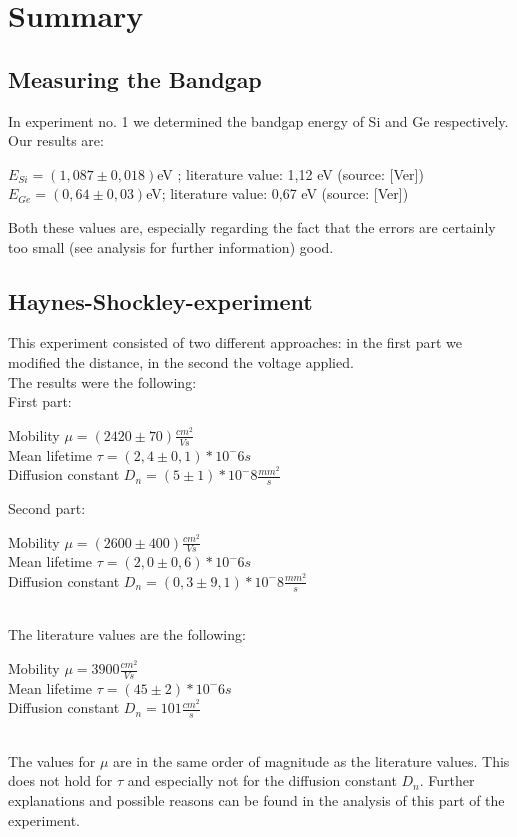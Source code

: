 \chapter{Summary}
\section{Measuring the Bandgap}
In experiment no. 1 we determined the bandgap energy of Si and Ge respectively. Our results are:\\
\begin{center}
$E_{Si}=(1,087\pm 0,018)$eV ; literature value: 1,12 eV (source: [Ver])\\
$E_{Ge}=(0,64\pm0,03)$eV; literature value: 0,67 eV (source: [Ver])\\
\end{center}
Both these values are, especially regarding the fact that the errors are certainly too small (see analysis for further information) good. \\
\section{Haynes-Shockley-experiment}
This experiment consisted of two different approaches: in the first part we modified the distance, in the second the voltage applied.\\
The results were the following:\\
First part:\\
\begin{center}
Mobility $\mu=(2420\pm 70)\frac{cm^2}{Vs}$\\
Mean lifetime $\tau=(2,4\pm 0,1)*10^-6 s$\\
Diffusion constant $D_{n}=(5\pm1)*10^-8 \frac{mm^2}{s}$
\end{center}
Second part:\\
\begin{center}
Mobility $\mu=(2600\pm 400) \frac{cm^2}{Vs}$\\
Mean lifetime $\tau=(2,0\pm 0,6)*10^-6 s$\\
Diffusion constant $D_{n}=(0,3\pm9,1)*10^-8 \frac{mm^2}{s}$
\end{center}
~\\
The literature values are the following:\\
\begin{center}
Mobility $\mu=3900 \frac{cm^2}{Vs}$\\
Mean lifetime $\tau=(45\pm 2)*10^-6 s$\\
Diffusion constant $D_{n}=101 \frac{cm^2}{s}$
\end{center}
~\\
The values for $\mu$ are in the same order of magnitude as the literature values. This does not hold for $\tau$ and especially not for the diffusion constant $D_{n}$. Further explanations and possible reasons can be found in the analysis of this part of the experiment.\\
~\\
